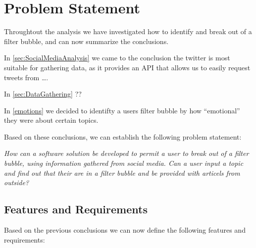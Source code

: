 \chapter{Problem Statement}

Throughtout the analysis we have investigated how to identify and break out of a
filter bubble, and can now summarize the conclusions.\nl

In \autoref{sec:SocialMediaAnalysis} we came to the conclusion the twitter is
most suitable for gathering data, as it provides an API that allows us to easily
request tweets from \ldots {}.\nl

In \autoref{sec:DataGathering} ??\nl

In \autoref{emotions} we decided to identifty a users filter bubble by how
``emotional'' they were about certain topics.\nl

Based on these conclusions, we can establish the following problem statement:

\begin{center}
\begin{minipage}{0.8\linewidth}

\textit{How can a software solution be developed to permit a user to break out of
a filter bubble, using information gathered from social media.
Can a user input a topic and find out that their are in a filter bubble and be
provided with articels from outside?}

\end{minipage}
\end{center}

\section{Features and Requirements}
Based on the previous conclusions we can now define the following features and
requirements:



